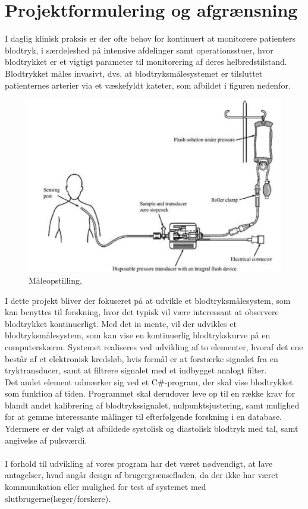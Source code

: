 \chapter{Projektformulering og afgrænsning}
I daglig klinisk praksis er der ofte behov for kontinuert at monitorere patienters blodtryk, i særdeleshed på intensive afdelinger samt operationsstuer, hvor blodtrykket er et vigtigt parameter til monitorering af deres helbredstilstand. \\
Blodtrykket måles invasivt, dvs. at blodtryksmålesystemet er tilsluttet patienternes arterier via et væskefyldt kateter, som afbildet i figuren nedenfor.
\begin{figure}[H]
	\centering
	\includegraphics[width=1\textwidth]{Figurer/Snip20151207_50}
	\caption{Måleopstilling, \protect\cite[s. 296]{Billed for invasiv blodtryksmaling}}
\end{figure}

I dette projekt bliver der fokuseret på at udvikle et blodtryksmålesystem, som kan benyttes til forskning, hvor det typisk vil være interessant at observere blodtrykket kontinuerligt. 
Med det in mente, vil der udvikles et blodtryksmålesystem, som kan vise en kontinuerlig blodtrykskurve på en computerskærm.
Systemet realiseres ved udvikling af to elementer, hvoraf det ene består af et elektronisk kredsløb, hvis formål er at forstærke signalet fra en tryktransducer, samt at filtrere signalet med et indbygget analogt filter.\\
Det andet element udmærker sig ved et C\#-program, der skal vise blodtrykket som funktion af tiden. Programmet skal derudover leve op til en række krav for blandt andet kalibrering af blodtrykssignalet, nulpunktsjustering, samt mulighed for at gemme interessante målinger til efterfølgende forskning i en database.
Ydermere er der valgt at afbildede systolisk og diastolisk blodtryk med tal, samt angivelse af pulsværdi.\\\\
I forhold til udvikling af vores program har det været nødvendigt, at lave antagelser, hvad angår design af brugergrænsefladen, da der ikke har været kommunikation eller mulighed for test af systemet med slutbrugerne(læger/forskere). 


